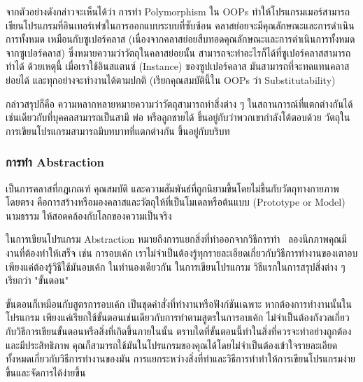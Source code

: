 \documentclass[12pt,one side,openright,a4paper]{cpe-thesis-th}
\newcommand{\thaijustify}[1]{%
  \par\hspace{30pt}\justifying
  #1
}
\begin{document}
            \thaijustify{
                จากตัวอย่างดังกล่าวจะเห็นได้ว่า การทำ Polymorphism ใน OOPs ทำให้โปรแกรมเมอร์สามารถเขียนโปรแกรมที่อินเทอร์เฟซในการออกแบบระบบที่ซับซ้อน คลาสย่อยจะมีคุณลักษณะและการดำเนินการทั้งหมด เหมือนกับซูเปอร์คลาส (เนื่องจากคลาสย่อยสืบทอดคุณลักษณะและการดำเนินการทั้งหมดจากซูเปอร์คลาส) ซึ่งหมายความว่าวัตถุในคลาสย่อยนั้น สามารถจะทำอะไรก็ได้ที่ซูเปอร์คลาสสามารถทำได้ ด้วยเหตุนี้ เมื่อเราใช้อินสแตนซ์ (Instance) ของซูปเปอร์คลาส มันสามารถที่จะทดแทนคลาสย่อยได้ และทุกอย่างจะทำงานได้ตามปกติ (เรียกคุณสมบัตินี้ใน OOPs ว่า Substitutability)~\cite{ntu20polymorph}
            }
            \thaijustify{
                กล่าวสรุปก็คือ ความหลากหลายหมายความว่าวัตถุสามารถทำสิ่งต่าง ๆ ในสถานการณ์ที่แตกต่างกันได้ เช่นเดียวกับที่บุคคลสามารถเป็นสามี พ่อ หรือลูกชายได้ ขึ้นอยู่กับว่าพวกเขากำลังโต้ตอบด้วย วัตถุในการเขียนโปรแกรมสามารถมีบทบาทที่แตกต่างกัน ขึ้นอยู่กับบริบท~\cite{nzeruekenneth23polymorph}
            }
        \subsubsection{การทำ Abstraction}
            \thaijustify{
                เป็นการคลาสที่กฎเกณฑ์ คุณสมบัติ และความสัมพันธ์ที่ถูกนิยามขึ้นโดยไม่ขึ้นกับวัตถุทางกายภาพโดยตรง คือการสร้างหรือมองคลาสและวัตถุให้ที่เป็นโมเดลหรือต้นแบบ (Prototype or Model) นามธรรม ให้สอดคล้องกับโลกของความเป็นจริง~\cite{saladpukabstract}
            }
            \thaijustify{
                ในการเขียนโปรแกรม Abstraction หมายถึงการแยกสิ่งที่ทำออกจากวิธีการทำ~\cite{liskov87abstaction} ลองนึกภาพคุณมีงานที่ต้องทำให้เสร็จ เช่น การอบเค้ก เราไม่จำเป็นต้องรู้ทุกรายละเอียดเกี่ยวกับวิธีการทำงานของเตาอบ เพียงแค่ต้องรู้วิธีใช้มันอบเค้ก ในทำนองเดียวกัน ในการเขียนโปรแกรม วิธีแรกในการสรุปสิ่งต่าง ๆ เรียกว่า "ขั้นตอน"
            }
            \thaijustify{
                ขั้นตอนก็เหมือนกับสูตรการอบเค้ก เป็นชุดคำสั่งที่ทำงานหรือฟังก์ชันเฉพาะ หากต้องการทำงานนั้นในโปรแกรม เพียงแค่เรียกใช้ขั้นตอนเช่นเดียวกับการทำตามสูตรในการอบเค้ก ไม่จำเป็นต้องกังวลเกี่ยวกับวิธีการเขียนขั้นตอนหรือสิ่งที่เกิดขึ้นภายในนั้น ตราบใดที่ขั้นตอนนี้ทำในสิ่งที่ควรจะทำอย่างถูกต้องและมีประสิทธิภาพ คุณก็สามารถใช้มันในโปรแกรมของคุณได้โดยไม่จำเป็นต้องเข้าใจรายละเอียดทั้งหมดเกี่ยวกับวิธีการทำงานของมัน การแยกระหว่างสิ่งที่ทำและวิธีการทำทำให้การเขียนโปรแกรมง่ายขึ้นและจัดการได้ง่ายขึ้น
            }
\end{document}
